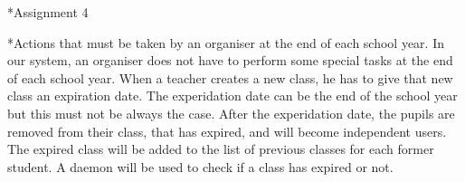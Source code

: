 \begin{section}*{Assignment 4}

    \begin{subsection}*{Actions that must be taken by an organiser at the end of each school year.}
    	In our system, an organiser does not have to perform some special tasks at the end of each school year. When a teacher creates a new class, he has to give that new class an expiration date. The experidation date can be the end of the school year but this must not be always the case. After the experidation date, the pupils are removed from their class, that has expired, and will become independent users. The expired class will be added to the list of previous classes for each former student. A daemon will be used to check if a class has expired or not. 
    \end{subsection}
    
\end{section}